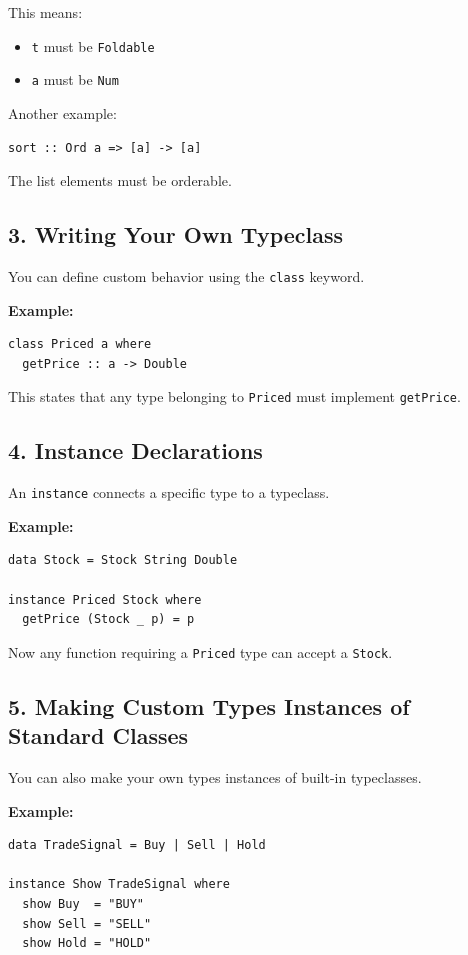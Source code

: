 \documentclass[12pt]{article}
\begin{document}
This means:
\begin{itemize}
  \item \texttt{t} must be \texttt{Foldable}
  \item \texttt{a} must be \texttt{Num}
\end{itemize}

Another example:

\begin{verbatim}
sort :: Ord a => [a] -> [a]
\end{verbatim}

The list elements must be orderable.

\subsection{3. Writing Your Own Typeclass}

You can define custom behavior using the \texttt{class} keyword.

\textbf{Example:}
\begin{verbatim}
class Priced a where
  getPrice :: a -> Double
\end{verbatim}

This states that any type belonging to \texttt{Priced} must implement \texttt{getPrice}.

\subsection{4. Instance Declarations}

An \texttt{instance} connects a specific type to a typeclass.

\textbf{Example:}
\begin{verbatim}
data Stock = Stock String Double

instance Priced Stock where
  getPrice (Stock _ p) = p
\end{verbatim}

Now any function requiring a \texttt{Priced} type can accept a \texttt{Stock}.

\subsection{5. Making Custom Types Instances of Standard Classes}

You can also make your own types instances of built-in typeclasses.

\textbf{Example:}
\begin{verbatim}
data TradeSignal = Buy | Sell | Hold

instance Show TradeSignal where
  show Buy  = "BUY"
  show Sell = "SELL"
  show Hold = "HOLD"
\end{verbatim}
\end{document}
